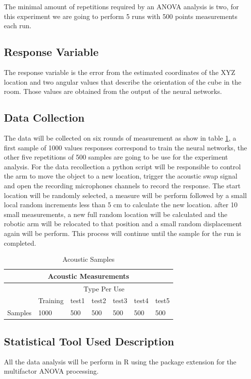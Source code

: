 The minimal amount of repetitions required by an ANOVA analysis is two, for this experiment we are going to perform 5 runs with 500 points measurements each run.  


\subsection{Response Variable}
The response variable is the error from the estimated coordinates of the XYZ location and two angular values that describe the orientation of the cube in the room. Those values are obtained from the output of the neural networks.  


\subsection{Data Collection}

The data will be collected on six rounds of measurement as show in table \ref{tab:acmeasure}, a first sample of 1000 values responses correspond to train the neural networks, the other five repetitions of 500 samples are going to be use for the experiment analysis.     
For the data recollection a python script will be responsible to control the arm to move the object to a new location, trigger the acoustic swap signal and open the recording microphones channels to record the response. The start location will be randomly selected, a measure will be perform followed by a small local random increments less than 5 cm to calculate the new location. after 10 small measurements, a new full random location will be calculated and the robotic arm will be relocated to that position and a small random displacement again will be perform. This process will continue until the sample for the run is completed.        



\begin{table}[h]
	\caption{Acoustic Samples}
	\label{tab:acmeasure}
	\begin{center}
		\begin{tabular}{|l|l|l|l|l|l|l|}
            \hline
            \multicolumn{7}{|c|}{Acoustic Measurements} \\
            \hline
             & \multicolumn{6}{|c|}{Type Per Use} \\ 
            \hline
			& Training  & test1 &  test2 & test3 & test4 & test5\\
            \hline
			Samples & 1000  & 500 &  500 & 500 & 500 & 500\\
            \hline
            
		\end{tabular}
	\end{center}
\end{table}


\subsection{Statistical Tool Used Description}

All the data analysis will be perform in R using the package extension for the multifactor ANOVA processing. 